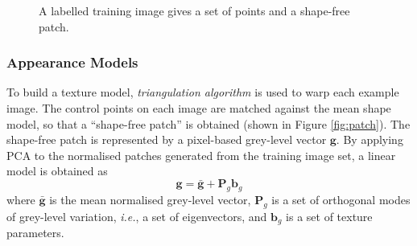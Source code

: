 \begin{figure}
\begin{center}
   \caption{A labelled training image gives a set of points and a shape-free patch.\cite{Cootes2001}}
  \end{center}
 \end{figure} 
\subsubsection{Appearance Models}
To build a texture model, \textit{triangulation algorithm} \cite{Cootes2000} is used to warp each example image. The control points on each image are matched against the mean shape model, so that a ``shape-free patch'' is obtained (shown in \mbox{Figure} \ref{fig:patch}). The shape-free patch is represented by a pixel-based grey-level vector $\mathbf{g}$. By applying PCA to the normalised patches generated from the training image set, a linear model is obtained as
\begin{equation}
 \mathbf{g} = \bar{\mathbf{g}} + \mathbf{P}_g \mathbf{b}_g
\end{equation}
where $\bar{\mathbf{g}}$ is the mean normalised grey-level vector, $\mathbf{P}_g$ is a set of orthogonal modes of grey-level variation, \textit{i.e.}, a set of eigenvectors, and $\mathbf{b}_g$ is a set of texture parameters.

